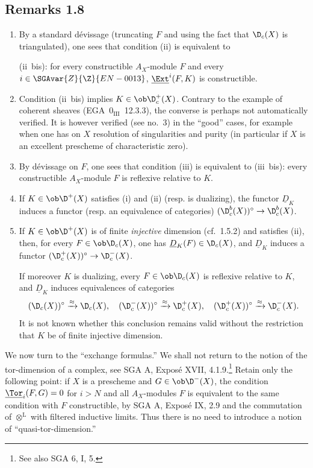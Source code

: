 \subsection*{Remarks 1.8}
\begin{enumerate}[label=\alph*)]
\item By a standard dévissage (truncating $F$ and using the fact that $\D_c(X)$ is triangulated), one sees that condition (ii) is equivalent to

(ii~bis): for every constructible $A_X$-module $F$ and every $i \in \SGAvar{Z}{\Z}{EN-0013}$, $\underline{\Ext}^i(F,K)$ is constructible.

\item Condition (ii~bis) implies $K \in \ob \D_c^{+}(X)$. Contrary to the example of coherent sheaves (EGA~$0_{\mathrm{III}}$~12.3.3), the converse is perhaps not automatically verified. It is however verified (see no.~3) in the ``good'' cases, for example when one has on $X$ resolution of singularities and purity (in particular if $X$ is an excellent prescheme of characteristic zero).

\item By dévissage on $F$, one sees that condition (iii) is equivalent to (iii~bis): every constructible $A_X$-module $F$ is reflexive relative to $K$.

\item If $K \in \ob \D^{+}(X)$ satisfies (i) and (ii) (resp. is dualizing), the functor $\underline{D}_K$ induces a functor (resp. an equivalence of categories) $(\D_c^{b}(X))^{\circ} \to \D_c^{b}(X)$.

\item If $K \in \ob \D^{+}(X)$ is of finite \emph{injective} dimension (cf.~1.5.2) and satisfies (ii), then, for every $F \in \ob \D_c(X)$, one has $\underline{D}_K(F) \in \D_c(X)$, and $\underline{D}_K$ induces a functor $(\D_c^{+}(X))^{\circ} \to \D_c^{-}(X)$.

If moreover $K$ is dualizing, every $F \in \ob \D_c(X)$ is reflexive relative to $K$, and $\underline{D}_K$ induces equivalences of categories
\[
(\D_c(X))^{\circ} \xrightarrow{\approx} \D_c(X), \quad (\D_c^{-}(X))^{\circ} \xrightarrow{\approx} \D_c^{+}(X), \quad (\D_c^{+}(X))^{\circ} \xrightarrow{\approx} \D_c^{-}(X).
\]
It is not known whether this conclusion remains valid without the restriction that $K$ be of finite injective dimension.
\end{enumerate}

We now turn to the ``exchange formulas.'' We shall not return to the notion of the tor-dimension of a complex, see SGA A, Exposé XVII, 4.1.9.\footnote{See also SGA 6, I, 5.} Retain only the following point: if $X$ is a prescheme and $G\in\ob\D^-(X)$, the condition $\underline{\Tor}_i(F,G)=0$ for $i>N$ and all $A_X$-modules $F$ is equivalent to the same condition with $F$ constructible, by SGA A, Exposé IX, 2.9 and the commutation of $\otimes^{\mathrm L}$ with filtered inductive limits. Thus there is no need to introduce a notion of ``quasi-tor-dimension.''

